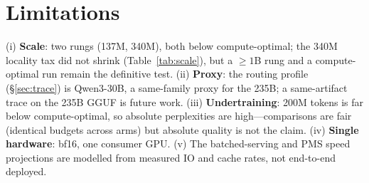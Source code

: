 \documentclass[11pt]{article}
\begin{document}
\section{Limitations}
\label{sec:limits}
(i) \textbf{Scale}: two rungs (137M, 340M), both below compute-optimal; the 340M
locality tax did not shrink (Table~\ref{tab:scale}), but a $\ge\!1$B rung and a
compute-optimal run remain the definitive test. (ii) \textbf{Proxy}:
the routing profile (\S\ref{sec:trace}) is Qwen3-30B, a same-family proxy for
the 235B; a same-artifact trace on the 235B GGUF is future work. (iii)
\textbf{Undertraining}: 200M tokens is far below compute-optimal, so absolute
perplexities are high---comparisons are fair (identical budgets across arms) but
absolute quality is not the claim. (iv) \textbf{Single hardware}: bf16, one
consumer GPU. (v) The batched-serving and PMS speed projections are modelled
from measured IO and cache rates, not end-to-end deployed.
\end{document}
